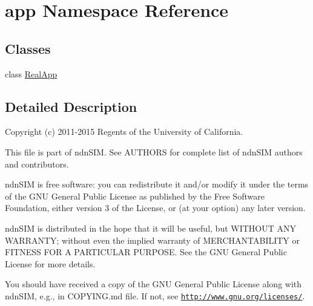 \hypertarget{namespaceapp}{}\section{app Namespace Reference}
\label{namespaceapp}
\subsection*{Classes}
\begin{DoxyCompactItemize}
\item 
class \hyperlink{classapp_1_1RealApp}{Real\+App}
\end{DoxyCompactItemize}


\subsection{Detailed Description}
Copyright (c) 2011-\/2015 Regents of the University of California.

This file is part of ndn\+S\+IM. See A\+U\+T\+H\+O\+RS for complete list of ndn\+S\+IM authors and contributors.

ndn\+S\+IM is free software\+: you can redistribute it and/or modify it under the terms of the G\+NU General Public License as published by the Free Software Foundation, either version 3 of the License, or (at your option) any later version.

ndn\+S\+IM is distributed in the hope that it will be useful, but W\+I\+T\+H\+O\+UT A\+NY W\+A\+R\+R\+A\+N\+TY; without even the implied warranty of M\+E\+R\+C\+H\+A\+N\+T\+A\+B\+I\+L\+I\+TY or F\+I\+T\+N\+E\+SS F\+OR A P\+A\+R\+T\+I\+C\+U\+L\+AR P\+U\+R\+P\+O\+SE. See the G\+NU General Public License for more details.

You should have received a copy of the G\+NU General Public License along with ndn\+S\+IM, e.\+g., in C\+O\+P\+Y\+I\+N\+G.\+md file. If not, see \href{http://www.gnu.org/licenses/}{\tt http\+://www.\+gnu.\+org/licenses/}. 